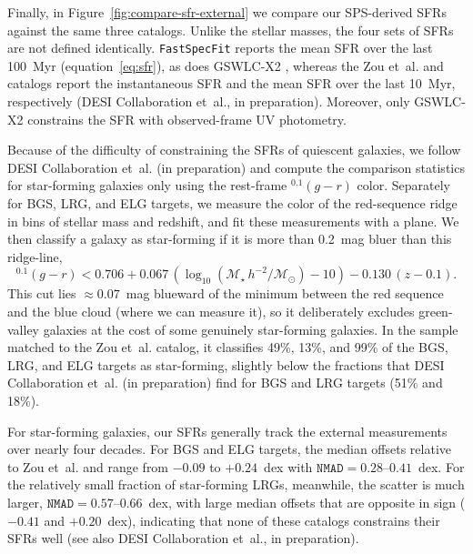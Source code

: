 \documentclass[modern,linenumbers]{aastex702}
\newcommand{\fastspecfit}{\texttt{FastSpecFit}}
\newcommand{\Mstar}{\ensuremath{\mathcal{M}_{\star}}}
\newcommand{\msun}{\ensuremath{\mathcal{M}_{\odot}}}
\newcommand{\logmstar}{\ensuremath{\log_{10}(\Mstar\,h^{-2}/\msun)}}
\begin{document}
Finally, in Figure~\ref{fig:compare-sfr-external} we compare
  our SPS-derived SFRs against the same three catalogs. Unlike the
  stellar masses, the four sets of SFRs are not defined
  identically. \fastspecfit{} reports the mean SFR over the last
  100~Myr (equation~\ref{eq:sfr}), as does GSWLC-X2 \citep{salim16a},
  whereas the Zou et~al. and \citet{siudek24a} catalogs report the
  instantaneous SFR and the mean SFR over the last 10~Myr,
  respectively (DESI Collaboration et~al., in preparation). Moreover,
  only GSWLC-X2 constrains the SFR with observed-frame UV
  \citep[GALEX;][]{martin05a} photometry.

Because of the difficulty of constraining the SFRs of quiescent
  galaxies, we follow DESI Collaboration et~al. (in preparation) and
  compute the comparison statistics for star-forming galaxies only
  using the rest-frame $^{0.1}(g-r)$ color. Separately for BGS, LRG,
  and ELG targets, we measure the color of the red-sequence ridge in
  bins of stellar mass and redshift, and fit these measurements with a
  plane.
  We then classify a galaxy as star-forming if it is more than 0.2~mag
  bluer than this ridge-line,
\begin{equation}
  ^{0.1}(g-r) < 0.706 + 0.067\,(\logmstar-10) - 0.130\,(z-0.1).
  \label{eq:grcut}
\end{equation}
This cut lies $\approx0.07$~mag blueward of the minimum between
  the red sequence and the blue cloud (where we can measure it), so it
  deliberately excludes green-valley galaxies at the cost of some
  genuinely star-forming galaxies. In the sample matched to the Zou
  et~al. catalog, it classifies 49\%, 13\%, and 99\% of the BGS, LRG,
  and ELG targets as star-forming, slightly below the fractions that
  DESI Collaboration et~al. (in preparation) find for BGS and LRG
  targets (51\% and 18\%).

For star-forming galaxies, our SFRs generally track the
  external measurements over nearly four decades. For BGS and ELG
  targets, the median offsets relative to Zou et~al. and
  \citet{siudek24a} range from $-0.09$ to $+0.24$~dex with
  $\mathtt{NMAD}=0.28$--$0.41$~dex. For the relatively small fraction
  of star-forming LRGs, meanwhile, the scatter is much larger,
  $\mathtt{NMAD}=0.57$--$0.66$~dex, with large median offsets that are
  opposite in sign ($-0.41$ and $+0.20$~dex), indicating that none of
  these catalogs constrains their SFRs well (see also DESI
  Collaboration et~al., in preparation).
\end{document}
